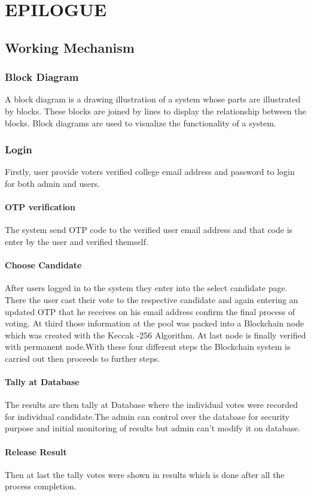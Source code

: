 \documentclass[a4paper,12pt]{report}
\begin{document}
\chapter{EPILOGUE}
\section{Working Mechanism}
\subsection{Block Diagram}
A block diagram is a drawing illustration of a system whose parts are illustrated by blocks. These blocks are joined by lines to display the relationship between the blocks. Block diagrams are used to visualize the functionality of a system.
\subsection{Login}
Firstly, user provide voters verified college email address and password to login for both admin and users.
\subsubsection{OTP verification}
The system send OTP code to the verified user email address and that code is enter by the user and verified themself. 
\subsubsection{Choose Candidate}
After users logged in to the system they enter into the select candidate page. There the user cast their vote to the respective candidate and again entering an updated OTP that he receives on his email address confirm the final process of voting. At third those information at the pool was packed into a Blockchain node which was created with the Keccak -256 Algorithm. At last node is finally verified with permanent node.With these four different steps the Blockchain system is carried out then proceeds to further steps.
\subsubsection{Tally at Database}
The results are then tally at Database where the individual votes were recorded for individual candidate.The admin can control over the database for security purpose and initial monitoring of results but admin can’t modify it on database.
\subsubsection{Release Result}
Then at last the tally votes were shown in results which is done after all the process completion.
\end{document}
